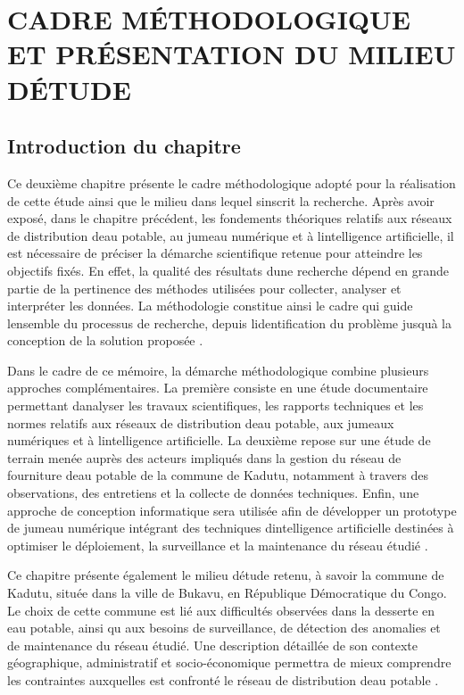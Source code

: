 \chapter{CADRE MÉTHODOLOGIQUE ET PRÉSENTATION DU MILIEU D\textquotesingle ÉTUDE}\label{chapitre-ii-cadre-muxe9thodologique-et-pruxe9sentation-du-milieu-duxe9tude}

\section{Introduction du chapitre}\label{introduction-du-chapitre}

Ce deuxième chapitre présente le cadre méthodologique adopté pour la
réalisation de cette étude ainsi que le milieu dans lequel
s\textquotesingle inscrit la recherche. Après avoir exposé, dans le
chapitre précédent, les fondements théoriques relatifs aux réseaux de
distribution d\textquotesingle eau potable, au jumeau numérique et à
l\textquotesingle intelligence artificielle, il est nécessaire de
préciser la démarche scientifique retenue pour atteindre les objectifs
fixés. En effet, la qualité des résultats d\textquotesingle une
recherche dépend en grande partie de la pertinence des méthodes
utilisées pour collecter, analyser et interpréter les données. La
méthodologie constitue ainsi le cadre qui guide
l\textquotesingle ensemble du processus de recherche, depuis
l\textquotesingle identification du problème jusqu\textquotesingle à la
conception de la solution proposée \cite{ref75}.

Dans le cadre de ce mémoire, la démarche méthodologique combine
plusieurs approches complémentaires. La première consiste en une étude
documentaire permettant d\textquotesingle analyser les travaux
scientifiques, les rapports techniques et les normes relatifs aux
réseaux de distribution d\textquotesingle eau potable, aux jumeaux
numériques et à l\textquotesingle intelligence artificielle. La deuxième
repose sur une étude de terrain menée auprès des acteurs impliqués dans
la gestion du réseau de fourniture d\textquotesingle eau potable de la
commune de Kadutu, notamment à travers des observations, des entretiens
et la collecte de données techniques. Enfin, une approche de conception
informatique sera utilisée afin de développer un prototype de jumeau
numérique intégrant des techniques d\textquotesingle intelligence
artificielle destinées à optimiser le déploiement, la surveillance et la
maintenance du réseau étudié \cite{ref81}.

Ce chapitre présente également le milieu d\textquotesingle étude retenu,
à savoir la commune de Kadutu, située dans la ville de Bukavu, en
République Démocratique du Congo. Le choix de cette commune est lié aux
difficultés observées dans la desserte en eau potable, ainsi qu\textquotesingle
aux besoins de surveillance, de détection des anomalies et de maintenance
du réseau étudié. Une description
détaillée de son contexte géographique, administratif et
socio-économique permettra de mieux comprendre les contraintes
auxquelles est confronté le réseau de distribution d\textquotesingle eau
potable \cite{ref82}.

